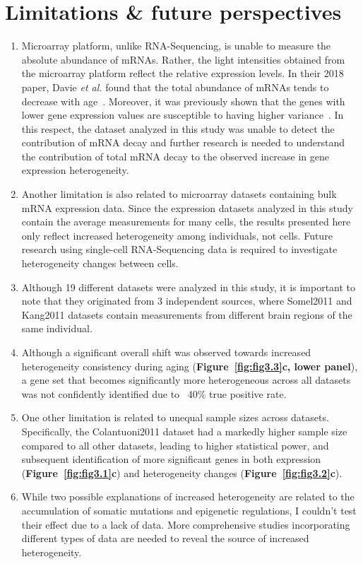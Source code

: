 \section{Limitations \& future perspectives}
\begin{enumerate}
    \item Microarray platform, unlike RNA-Sequencing, is unable to measure the absolute abundance of mRNAs. 
    Rather, the light intensities obtained from the microarray platform reflect the relative expression levels.
    In their 2018 paper, Davie \textit{et al.} found that the total abundance of mRNAs tends to decrease with age~\cite{Davie2018}.
    Moreover, it was previously shown that the genes with lower gene expression values are susceptible to having higher variance~\cite{Aris2004}.
    In this respect, the dataset analyzed in this study was unable to detect the contribution of mRNA decay and
    further research is needed to understand the contribution of total mRNA decay to the observed increase in gene expression heterogeneity.
    \item Another limitation is also related to microarray datasets containing bulk mRNA expression data.
    Since the expression datasets analyzed in this study contain the average measurements for many cells,
    the results presented here only reflect increased heterogeneity among individuals, not cells.
    Future research using single-cell RNA-Sequencing data is required to investigate heterogeneity changes between cells.
    \item Although 19 different datasets were analyzed in this study, it is important to note that they originated from 3 independent sources,
    where Somel2011 and Kang2011 datasets contain measurements from different brain regions of the same individual.
    \item Although a significant overall shift was observed towards increased heterogeneity consistency during aging (\textbf{Figure~\ref{fig:fig3.3}c, lower panel}),
    a gene set that becomes significantly more heterogeneous across all datasets was not confidently identified due to ~40\% true positive rate.
    \item One other limitation is related to unequal sample sizes across datasets. 
    Specifically, the Colantuoni2011 dataset had a markedly higher sample size compared to all other datasets,
    leading to higher statistical power, and subsequent identification of more significant genes in both expression (\textbf{Figure~\ref{fig:fig3.1}c}) 
    and heterogeneity changes (\textbf{Figure~\ref{fig:fig3.2}c}).
    \item While two possible explanations of increased heterogeneity are related to the accumulation of somatic mutations and epigenetic regulations,
    I couldn't test their effect due to a lack of data. 
    More comprehensive studies incorporating different types of data are needed to reveal the source of increased heterogeneity.
\end{enumerate}
